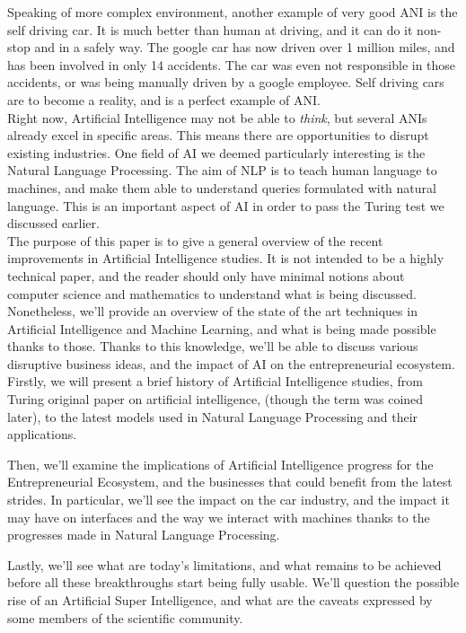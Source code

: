 \documentclass[12pt]{article}
\begin{document}
Speaking of more complex environment, another example of very good \gls{ANI} is
the self driving car. It is much better than human at driving, and it can do it
non-stop and in a safely way. The google car has now driven over 1 million
miles, and has been involved in only 14 accidents. The car was even not
responsible in those accidents, or was being manually driven by a google
employee. Self driving cars are to become a reality, and is a perfect example of
\gls{ANI}. \\

Right now, Artificial Intelligence may not be able to {\em think}, but several
ANIs already excel in specific areas. This means there are opportunities to
disrupt existing industries. One field of AI we deemed particularly interesting
is the Natural Language Processing. The aim of NLP is to teach human language to
machines, and make them able to understand queries formulated with natural
language. This is an important aspect of AI in order to pass the Turing test we
discussed earlier. \\

The purpose of this paper is to give a general overview of the recent
improvements in Artificial Intelligence studies. It is not intended to be a
highly technical paper, and the reader should only have minimal notions about
computer science and mathematics to understand what is being discussed.
Nonetheless, we'll provide an overview of the state of the art techniques in
Artificial Intelligence and Machine Learning, and what is being made possible
thanks to those. Thanks to this knowledge, we'll be able to discuss various
disruptive business ideas, and the impact of AI on the entrepreneurial
ecosystem. \\

Firstly, we will present a brief history of Artificial Intelligence studies, from
Turing original paper on artificial intelligence, (though the term was coined
later), to the latest models used in Natural Language Processing and their
applications.

\noindent Then, we'll examine the implications of Artificial Intelligence
progress for the Entrepreneurial Ecosystem, and the businesses that could benefit
from the latest strides. In particular, we'll see the impact on the car
industry, and the impact it may have on interfaces and the way we interact with
machines thanks to the progresses made in Natural Language Processing.

\noindent Lastly, we'll see what are today's limitations, and what remains to be
achieved before all these breakthroughs start being fully usable. We'll question
the possible rise of an Artificial Super Intelligence, and what are the caveats
expressed by some members of the scientific community.
\end{document}

